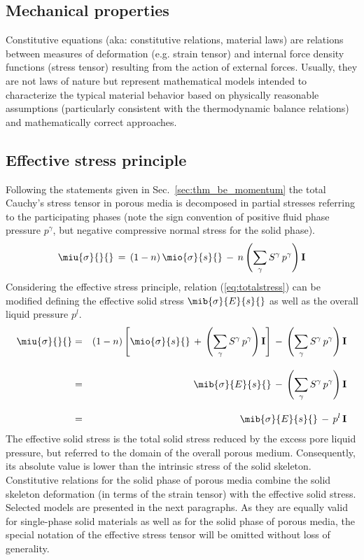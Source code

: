 \newpage
\subsection{Mechanical properties}
\label{sec:m_properties}

Constitutive equations (aka: constitutive relations, material laws) are relations between measures of deformation (e.g. strain tensor) and internal force density functions (stress tensor) resulting from the action of external forces. Usually, they are not laws of nature but represent mathematical models intended to characterize the typical material behavior based on physically reasonable assumptions (particularly consistent with the thermodynamic balance relations) and mathematically correct approaches.

\subsection{Effective stress principle}
\label{sec:effstress}

Following the statements given in Sec.~\ref{sec:thm_be_momentum} the total Cauchy's stress tensor in porous media is decomposed in partial stresses referring to the participating phases (note the sign convention of positive fluid phase pressure $p^{\gamma}$, but negative compressive normal stress for the solid phase).
\begin{equation}
\miu{\sigma}{}{}\,=\,(1-n)\,\mio{\sigma}{s}{}\,-\,n
\left(\sum\limits_{\gamma}S^{\gamma}\,p^{\gamma}\right)\mathbf{I}
\label{eq:totalstress}
\end{equation}
Considering the effective stress principle, relation (\ref{eq:totalstress}) can be modified defining the effective solid stress $\mib{\sigma}{E}{s}{}$ as well as the overall liquid pressure $p^{l}$.
\begin{eqnarray}
\miu{\sigma}{}{} & = & 
(1-n)\left[
\mio{\sigma}{s}{}\,+\,\left(\sum\limits_{\gamma}S^{\gamma}\,p^{\gamma}\right)\mathbf{I}
\right]
\,-\,\left(\sum\limits_{\gamma}S^{\gamma}\,p^{\gamma}\right)\mathbf{I} \nonumber \\[2.0ex]
 & = &
\mib{\sigma}{E}{s}{}
\,-\,\left(\sum\limits_{\gamma}S^{\gamma}\,p^{\gamma}\right)\mathbf{I} \nonumber \\[2.0ex]
 & = &
\mib{\sigma}{E}{s}{}\,-\,p^{l}\,\mathbf{I}
\label{eq:effect_stress}
\end{eqnarray}
The effective solid stress is the total solid stress reduced by the excess pore liquid pressure, but referred to the domain of the overall porous medium. Consequently, its absolute value is lower than the intrinsic stress of the solid skeleton. Constitutive relations for the solid phase of porous media combine the solid skeleton deformation (in terms of the strain tensor) with the effective solid stress. Selected models are presented in the next paragraphs. As they are equally valid for single-phase solid materials as well as for the solid phase of porous media, the special notation of the effective stress tensor will be omitted without loss of generality.

